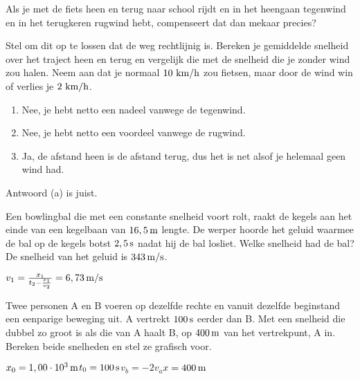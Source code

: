 \documentclass{ximera}
\begin{document}
\begin{exercise} Als je met de fiets heen en terug naar school rijdt en in het heengaan tegenwind en in het terugkeren rugwind hebt, compenseert dat dan mekaar precies?

Stel om dit op te lossen dat de weg rechtlijnig is. Bereken je gemiddelde snelheid over het traject heen en terug en vergelijk die met de snelheid die je zonder wind zou halen. Neem aan dat je normaal $10~\rm km/h$ zou fietsen, maar door de wind win of verlies je $2~\rm km/h$.
\begin{enumerate}
\item Nee, je hebt netto een nadeel vanwege de tegenwind.
\item Nee, je hebt netto een voordeel vanwege de rugwind.
\item Ja, de afstand heen is de afstand terug, dus het is net alsof je helemaal geen wind had.
\end{enumerate}
\begin{oplossing}
Antwoord (a) is juist.
\end{oplossing}

\end{exercise}

\begin{exercise} Een bowlingbal die met een constante snelheid voort rolt, raakt de kegels aan het einde van een kegelbaan van $16,5\rm\,m$ lengte. De werper hoorde het geluid waarmee de bal op de kegels botst $2,5\rm\,s$ nadat hij de bal losliet. Welke snelheid had de bal? De snelheid van het geluid is $343\rm\,m/s$. 
\begin{oplossing}
$v_1=\frac{x_1}{t_2-\frac{x_1}{v_2}}=6,73\rm\,m/s$
\end{oplossing}

\end{exercise}

\begin{exercise} Twee personen A en B voeren op dezelfde rechte en vanuit dezelfde beginstand een eenparige beweging uit. A vertrekt $100\rm\,s$ eerder dan B. Met een snelheid die dubbel zo groot is als die van A haalt B, op $400\rm\,m$ van het vertrekpunt, A in. Bereken beide snelheden en stel ze grafisch voor.
\end{exercise}

\begin{exercise}[gegeven]$x_0=1,00\cdot10^3\rm\,m$\newline$t_0=100\rm\,s$\newline$v_b=-2v_a$\newline$x=400\rm\,m$
\end{exercise}
\end{document}
